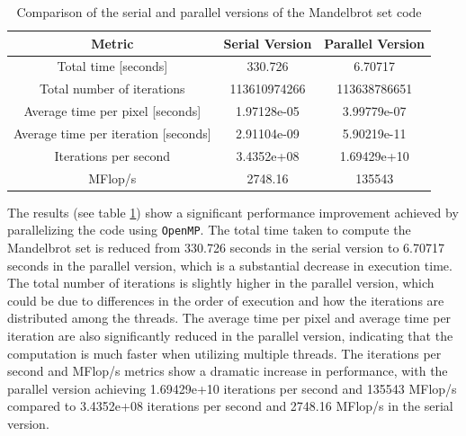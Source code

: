 \documentclass[unicode,10pt,a4paper,oneside,numbers=endperiod,openany]{scrartcl}
\begin{document}
\begin{table}[!h]
\centering
\begin{tabular}{|c|c|c|}
\hline
Metric & Serial Version & Parallel Version \\
\hline
Total time [seconds] & 330.726 & 6.70717 \\
Total number of iterations & 113610974266 & 113638786651 \\
Average time per pixel [seconds] & 1.97128e-05 & 3.99779e-07 \\
Average time per iteration [seconds] & 2.91104e-09 & 5.90219e-11 \\
Iterations per second & 3.4352e+08 & 1.69429e+10 \\
MFlop/s & 2748.16 & 135543 \\
\hline
\end{tabular}
\caption{Comparison of the serial and parallel versions of the Mandelbrot set code}
\label{tab:mandelbrot_results}
\end{table}

The results (see table \ref{tab:mandelbrot_results}) show a significant performance improvement achieved by parallelizing the code using \texttt{OpenMP}. The total time taken to compute the Mandelbrot set is reduced from 330.726 seconds in the serial version to 6.70717 seconds in the parallel version, which is a substantial decrease in execution time. The total number of iterations is slightly higher in the parallel version, which could be due to differences in the order of execution and how the iterations are distributed among the threads. The average time per pixel and average time per iteration are also significantly reduced in the parallel version, indicating that the computation is much faster when utilizing multiple threads. The iterations per second and MFlop/s metrics show a dramatic increase in performance, with the parallel version achieving 1.69429e+10 iterations per second and 135543 MFlop/s compared to 3.4352e+08 iterations per second and 2748.16 MFlop/s in the serial version.
\end{document}
